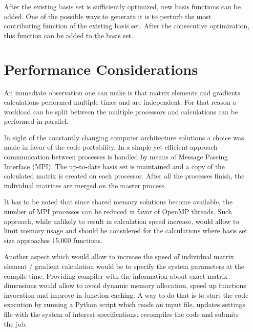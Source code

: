After the existing basis set is sufficiently optimized, 
new basis functions can be added. One of the possible 
ways to generate it is to perturb the most contributing
function of the existing basis set. After the consecutive
optimization, this function can be added to the basis set.

\section{Performance Considerations}

An immediate observation one can make is that matrix elements
and gradients calculations performed multiple times and are
independent. For that reason a workload can be split between 
the multiple processors and calculations can be performed 
in parallel. 

In sight of the constantly changing computer architecture 
solutions a choice was made in favor of the code portability.
In a simple yet efficient approach communication between
processes is handled by means of Message Passing Interface (MPI).
The up-to-date basis set is maintained and
a copy of the calculated matrix is created on each processor.
After all the processes finish, the individual matrices are merged
on the master process.

It has to be noted that since shared memory solutions become 
available, the number of MPI processes can be reduced in favor 
of OpenMP threads. Such approach, while unlikely to result 
in calculation speed increase, would allow to limit memory 
usage and should be considered for the calculations where
basis set size approaches 15,000 functions.

Another aspect which would allow to increase the speed of individual
matrix element / gradient calculation would be to specify the system
parameters at the compile time. Providing compiler with the information
about exact matrix dimensions would allow to avoid dynamic memory
allocation, speed up functions invocation and improve in-function
caching. A way to do that is to start the code execution by 
running a Python script which reads an input file, updates 
settings file with the system of interest specifications,
recompiles the code and submits the job.





